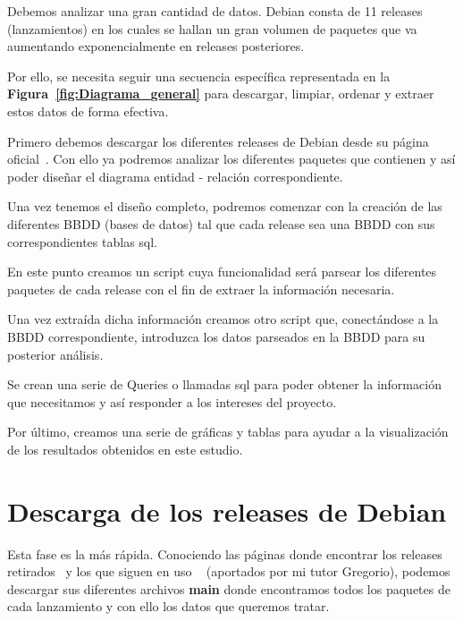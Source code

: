 \documentclass[a4paper, 12pt]{book}
\begin{document}
Debemos analizar una gran cantidad de datos. Debian consta de 11 releases (lanzamientos) en los cuales se hallan un gran volumen de paquetes que va aumentando exponencialmente en releases posteriores.

Por ello, se necesita seguir una secuencia específica representada en la \textbf {Figura~\ref{fig:Diagrama_general}} para descargar, limpiar, ordenar y extraer estos datos de forma efectiva. 

Primero debemos descargar los diferentes releases de Debian desde su página oficial~\cite{oficialdebian:_releases}.
Con ello ya podremos analizar los diferentes paquetes que contienen y así poder diseñar el diagrama entidad - relación correspondiente.

Una vez tenemos el diseño completo, podremos comenzar con la creación de las diferentes BBDD (bases de datos) tal que cada release sea una BBDD con sus correspondientes tablas sql.

En este punto creamos un script cuya funcionalidad será parsear los diferentes paquetes de cada release con el fin de extraer la información necesaria.

Una vez extraída dicha información creamos otro script que, conectándose a la BBDD correspondiente, introduzca los datos parseados en la BBDD para su posterior análisis.

Se crean una serie de Queries o llamadas sql para poder obtener la información que necesitamos y así responder a los intereses del proyecto.

Por último, creamos una serie de gráficas y tablas para ayudar a la visualización de los resultados obtenidos en este estudio.


\section{Descarga de los releases de Debian} 
\label{sec:Descarga_de_los_releases_de_Debian}

Esta fase es la más rápida. Conociendo las páginas donde encontrar los releases retirados~\cite{debian:_releases_archive} y los que siguen en uso ~\cite{debian:_releases} (aportados por mi tutor Gregorio), podemos descargar sus diferentes archivos \textbf{main} donde encontramos todos los paquetes de cada lanzamiento y con ello los datos que queremos tratar.
\end{document}
